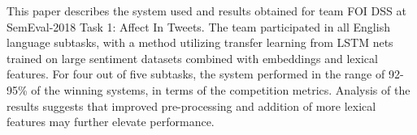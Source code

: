 This paper describes the system used and results obtained for team FOI DSS at SemEval-2018 Task 1: Affect In Tweets. The team participated in all English language subtasks, with a method utilizing transfer learning from LSTM nets trained on large sentiment datasets combined with embeddings and lexical features. For four out of five subtasks, the system performed in the range of 92-95\% of the winning systems, in terms of the competition metrics. Analysis of the results suggests that improved pre-processing and addition of more lexical features may further elevate performance.
